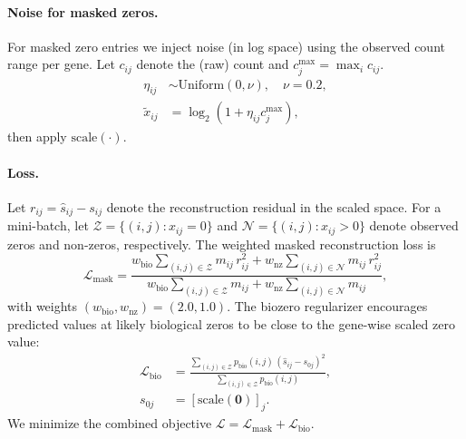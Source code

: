 \documentclass{article}
\theoremstyle{plain}
\theoremstyle{definition}
\theoremstyle{remark}
\begin{document}
\paragraph{Noise for masked zeros.}
For masked zero entries we inject noise (in log space) using the observed count
range per gene. Let $c_{ij}$ denote the (raw) count and
$c^{\max}_j=\max_i c_{ij}$.
\[
\begin{aligned}
\eta_{ij}&\sim\mathrm{Uniform}(0,\nu),\quad \nu=0.2,\\
\tilde{x}_{ij}&=\log_2(1+\eta_{ij}c^{\max}_j),
\end{aligned}
\]
then apply $\mathrm{scale}(\cdot)$.

\paragraph{Loss.}
Let $r_{ij}=\hat{s}_{ij}-s_{ij}$ denote the reconstruction residual in the
scaled space. For a mini-batch, let $\mathcal{Z}=\{(i,j): x_{ij}=0\}$ and
$\mathcal{N}=\{(i,j): x_{ij}>0\}$ denote observed zeros and non-zeros,
respectively. The weighted masked reconstruction loss is
\[
\mathcal{L}_{\mathrm{mask}}=
\frac{w_{\mathrm{bio}}\sum_{(i,j)\in\mathcal{Z}} m_{ij}\,r_{ij}^2
      +w_{\mathrm{nz}}\sum_{(i,j)\in\mathcal{N}} m_{ij}\,r_{ij}^2}
     {w_{\mathrm{bio}}\sum_{(i,j)\in\mathcal{Z}} m_{ij}
      +w_{\mathrm{nz}}\sum_{(i,j)\in\mathcal{N}} m_{ij}},
\]
with weights $(w_{\mathrm{bio}},w_{\mathrm{nz}})=(2.0,1.0)$.
The biozero regularizer encourages predicted values at likely biological zeros
to be close to the gene-wise scaled zero value:
\[
\begin{aligned}
\mathcal{L}_{\mathrm{bio}}
&=\frac{\sum_{(i,j)\in\mathcal{Z}} p_{\mathrm{bio}}(i,j)\,(\hat{s}_{ij}-s_{0j})^2}
       {\sum_{(i,j)\in\mathcal{Z}} p_{\mathrm{bio}}(i,j)},\\
s_{0j}&=[\mathrm{scale}(\mathbf{0})]_j.
\end{aligned}
\]
We minimize the combined objective
$\mathcal{L}=\mathcal{L}_{\mathrm{mask}}+\mathcal{L}_{\mathrm{bio}}$.
\end{document}
